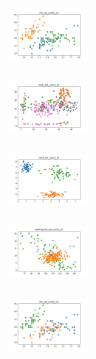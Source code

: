 \begin{figure}[H]
\begin{subfigure}
    \end{subfigure}
    \hfill
    \begin{subfigure}
        \centering
        \includegraphics[width=0.234\textwidth]{img/am01/iris_set_const_10_589741062_clust.png}
    \end{subfigure}
    \hfill
    \begin{subfigure}
        \centering
        \includegraphics[width=0.234\textwidth]{img/am01/ecoli_set_const_10_589741062_clust.png}
    \end{subfigure}
    \hfill
    \begin{subfigure}
        \centering
        \includegraphics[width=0.234\textwidth]{img/am01/rand_set_const_10_589741062_clust.png}
    \end{subfigure}
    \hfill
    \begin{subfigure}
        \centering
        \includegraphics[width=0.234\textwidth]{img/am01/newthyroid_set_const_10_589741062_clust.png}
    \end{subfigure}
    \hfill
    \begin{subfigure}
        \centering
        \includegraphics[width=0.234\textwidth]{img/am01/iris_set_const_10_277451237_clust.png}
    \end{subfigure}
    \hfill

\end{figure}
